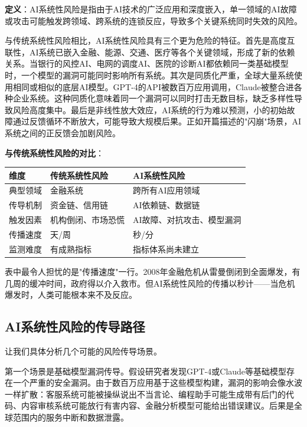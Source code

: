 \textbf{定义}：AI系统性风险是指由于AI技术的广泛应用和深度嵌入，单一领域的AI故障或攻击可能触发跨领域、跨系统的连锁反应，导致多个关键系统同时失效的风险。

与传统系统性风险相比，AI系统性风险具有三个更为危险的特征。首先是高度互联性，AI系统已嵌入金融、能源、交通、医疗等各个关键领域，形成了新的依赖关系。当银行的风控AI、电网的调度AI、医院的诊断AI都依赖同一类基础模型时，一个模型的漏洞可能同时影响所有系统。其次是同质化严重，全球大量系统使用相同或相似的底层AI模型。GPT-4的API被数百万应用调用，Claude被整合进各种企业系统。这种同质化意味着同一个漏洞可以同时打击无数目标，缺乏多样性导致风险高度集中。最后是非线性放大效应，AI系统的行为难以预测，小的初始故障通过反馈循环不断放大，可能导致大规模后果。正如开篇描述的"闪崩"场景，AI系统之间的正反馈会加剧风险。

\textbf{与传统系统性风险的对比}：

\begin{center}
\small
\begin{tabular}{|p{3cm}|p{5cm}|p{5cm}|}
\hline
\textbf{维度} & \textbf{传统系统性风险} & \textbf{AI系统性风险} \\
\hline
典型领域 & 金融系统 & 跨所有AI应用领域 \\
\hline
传导机制 & 资金链、信用链 & AI依赖链、数据链 \\
\hline
触发因素 & 机构倒闭、市场恐慌 & AI故障、对抗攻击、模型漏洞 \\
\hline
传播速度 & 天/周 & 秒/分 \\
\hline
监测难度 & 有成熟指标 & 指标体系尚未建立 \\
\hline
\end{tabular}
\end{center}

表中最令人担忧的是"传播速度"一行。2008年金融危机从雷曼倒闭到全面爆发，有几周的缓冲时间，政府得以介入救市。但AI系统性风险的传播以秒计——当危机爆发时，人类可能根本来不及反应。

\subsection{AI系统性风险的传导路径}

让我们具体分析几个可能的风险传导场景。

第一个场景是基础模型漏洞传导。假设研究者发现GPT-4或Claude等基础模型存在一个严重的安全漏洞。由于数百万应用基于这些模型构建，漏洞的影响会像水波一样扩散：客服系统可能被操纵说出不当言论、编程助手可能生成带有后门的代码、内容审核系统可能放行有害内容、金融分析模型可能给出错误建议。后果是全球范围内的服务中断和数据泄露。


